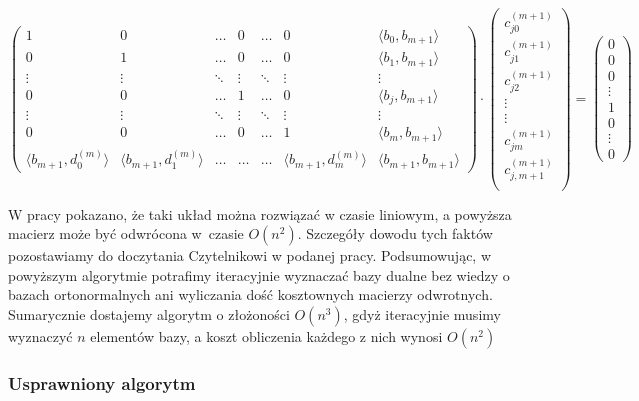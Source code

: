 \documentclass{article}
\begin{document}
 $$
 \begin{pmatrix}
1 & 0 & \ldots & 0 & \ldots & 0 & \langle b_{0}, b_{m+1} \rangle \\ 
0 & 1 & \ldots & 0 & \ldots & 0 & \langle b_{1}, b_{m+1} \rangle \\ 
\vdots & \vdots & \ddots & \vdots & \ddots & \vdots &  \vdots \\ 
0 & 0 & \ldots & 1 & \ldots & 0 & \langle b_{j}, b_{m+1} \rangle \\ 
\vdots & \vdots & \ddots & \vdots & \ddots & \vdots & \vdots \\ 
0 & 0 & \ldots & 0 & \ldots & 1 &  \langle b_{m}, b_{m+1} \rangle \\ 
\langle b_{m+1}, d_0^{(m)} \rangle & \langle b_{m+1}, d_1^{(m)} \rangle & \ldots & \ldots & \ldots & \langle b_{m+1}, d_m^{(m)} \rangle & \langle b_{m+1}, b_{m+1} \rangle
\end{pmatrix} \cdot \begin{pmatrix}
c_{j0}^{(m+1)} \\ 
c_{j1}^{(m+1)}\\ 
c_{j2}^{(m+1)}\\ 
\vdots \\ 
\vdots \\ 
c_{jm}^{(m+1)}\\
c_{j,m+1}^{(m+1)}\\ 
\end{pmatrix} =\begin{pmatrix}
0 \\ 
0\\ 
0\\ 
\vdots \\ 
1 \\ 
0\\
\vdots\\
0 
\end{pmatrix}  $$

W pracy \cite{PWO1} pokazano, że taki układ można rozwiązać w czasie liniowym, a powyższa macierz może być odwrócona w~czasie $O(n^2)$. Szczegóły dowodu tych faktów pozostawiamy do doczytania Czytelnikowi w podanej pracy. Podsumowując, w powyższym algorytmie potrafimy iteracyjnie wyznaczać bazy dualne bez wiedzy o bazach ortonormalnych ani wyliczania dość kosztownych macierzy odwrotnych. Sumarycznie dostajemy algorytm o złożoności $O(n^3)$, gdyż iteracyjnie musimy wyznaczyć $n$ elementów bazy, a koszt obliczenia każdego z nich wynosi $O(n^2)$

\subsubsection{Usprawniony algorytm}
\end{document}
